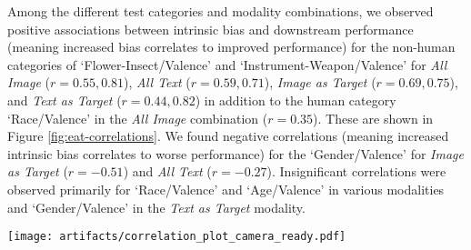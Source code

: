 Among the different test categories and modality combinations, we observed positive associations between intrinsic bias and downstream performance (meaning increased bias correlates to improved performance) for the non-human categories of `Flower-Insect/Valence' and `Instrument-Weapon/Valence' for   \textit{All Image} ($r=0.55, 0.81$), \textit{All Text} ($r=0.59, 0.71 $), \textit{Image as Target} ($r=0.69, 0.75$), and \textit{Text as Target} ($r=0.44, 0.82$) in addition to the human category `Race/Valence' in the \textit{All Image} combination ($r=0.35$). These are shown in Figure \ref{fig:eat-correlations}. We found negative correlations (meaning increased intrinsic bias correlates to worse performance) for the `Gender/Valence' for \textit{Image as Target} ($r=-0.51$) and \textit{All Text} ($r=-0.27$).  Insignificant correlations were observed primarily for `Race/Valence' and `Age/Valence' in various modalities and `Gender/Valence' in the \textit{Text as Target} modality.



\begin{figure*}[h]
    \centering
    \texttt{[image: artifacts/correlation\_plot\_camera\_ready.pdf]}
    \caption{Measure of Pearson's correlation $r$ between effect size magnitude and downstream VTAB+ performance across test categories and modality combinations. Significant values are marked with an asterisk.}
    \label{fig:eat-correlations}
\end{figure*}





